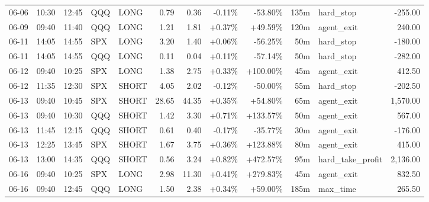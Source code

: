 \documentclass[11pt,a4paper,twoside]{article}
\begin{document}
\begin{center}
\begin{longtable}{>{\color{txtmain}}l l l l l r r r r r >{\color{txtmain}}l r}
06-06 & 10:30 & 12:45 & QQQ & LONG & 0.79 & 0.36 & \textcolor{lossred}{-0.11\%} & \textcolor{lossred}{-53.80\%} & 135m & hard\_stop & \textcolor{lossred}{-255.00} \\
06-09 & 09:40 & 11:40 & QQQ & LONG & 1.21 & 1.81 & \textcolor{wingreen}{+0.37\%} & \textcolor{wingreen}{+49.59\%} & 120m & agent\_exit & \textcolor{wingreen}{240.00} \\
06-11 & 14:05 & 14:55 & SPX & LONG & 3.20 & 1.40 & \textcolor{wingreen}{+0.06\%} & \textcolor{lossred}{-56.25\%} & 50m & hard\_stop & \textcolor{lossred}{-180.00} \\
06-11 & 14:05 & 14:55 & QQQ & LONG & 0.11 & 0.04 & \textcolor{wingreen}{+0.11\%} & \textcolor{lossred}{-57.14\%} & 50m & hard\_stop & \textcolor{lossred}{-282.00} \\
06-12 & 09:40 & 10:25 & SPX & LONG & 1.38 & 2.75 & \textcolor{wingreen}{+0.33\%} & \textcolor{wingreen}{+100.00\%} & 45m & agent\_exit & \textcolor{wingreen}{412.50} \\
06-12 & 11:35 & 12:30 & SPX & SHORT & 4.05 & 2.02 & \textcolor{lossred}{-0.12\%} & \textcolor{lossred}{-50.00\%} & 55m & hard\_stop & \textcolor{lossred}{-202.50} \\
06-13 & 09:40 & 10:45 & SPX & SHORT & 28.65 & 44.35 & \textcolor{wingreen}{+0.35\%} & \textcolor{wingreen}{+54.80\%} & 65m & agent\_exit & \textcolor{wingreen}{1,570.00} \\
06-13 & 09:40 & 10:30 & QQQ & SHORT & 1.42 & 3.30 & \textcolor{wingreen}{+0.71\%} & \textcolor{wingreen}{+133.57\%} & 50m & agent\_exit & \textcolor{wingreen}{567.00} \\
06-13 & 11:45 & 12:15 & QQQ & SHORT & 0.61 & 0.40 & \textcolor{lossred}{-0.17\%} & \textcolor{lossred}{-35.77\%} & 30m & agent\_exit & \textcolor{lossred}{-176.00} \\
06-13 & 12:25 & 13:45 & SPX & SHORT & 1.67 & 3.75 & \textcolor{wingreen}{+0.36\%} & \textcolor{wingreen}{+123.88\%} & 80m & agent\_exit & \textcolor{wingreen}{415.00} \\
06-13 & 13:00 & 14:35 & QQQ & SHORT & 0.56 & 3.24 & \textcolor{wingreen}{+0.82\%} & \textcolor{wingreen}{+472.57\%} & 95m & hard\_take\_profit & \textcolor{wingreen}{2,136.00} \\
06-16 & 09:40 & 10:25 & SPX & LONG & 2.98 & 11.30 & \textcolor{wingreen}{+0.41\%} & \textcolor{wingreen}{+279.83\%} & 45m & agent\_exit & \textcolor{wingreen}{832.50} \\
06-16 & 09:40 & 12:45 & QQQ & LONG & 1.50 & 2.38 & \textcolor{wingreen}{+0.34\%} & \textcolor{wingreen}{+59.00\%} & 185m & max\_time & \textcolor{wingreen}{265.50} \\

\end{longtable}
\end{center}
\end{document}
